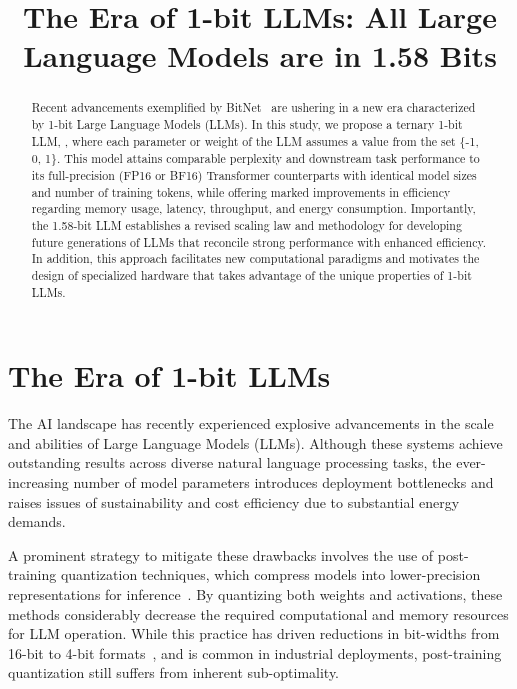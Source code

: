 \title{The Era of 1-bit LLMs: All Large Language Models are in 1.58 Bits}

\begin{abstract}
Recent advancements exemplified by BitNet~\cite{bitnet} are ushering in a new era characterized by 1-bit Large Language Models (LLMs). In this study, we propose a ternary 1-bit LLM, \textbf{}, where each parameter or weight of the LLM assumes a value from the set \{-1, 0, 1\}. This model attains comparable perplexity and downstream task performance to its full-precision (FP16 or BF16) Transformer counterparts with identical model sizes and number of training tokens, while offering marked improvements in efficiency regarding memory usage, latency, throughput, and energy consumption. Importantly, the 1.58-bit LLM establishes a revised scaling law and methodology for developing future generations of LLMs that reconcile strong performance with enhanced efficiency. In addition, this approach facilitates new computational paradigms and motivates the design of specialized hardware that takes advantage of the unique properties of 1-bit LLMs.
\end{abstract}

\section{The Era of 1-bit LLMs}

The AI landscape has recently experienced explosive advancements in the scale and abilities of Large Language Models (LLMs). Although these systems achieve outstanding results across diverse natural language processing tasks, the ever-increasing number of model parameters introduces deployment bottlenecks and raises issues of sustainability and cost efficiency due to substantial energy demands.

A prominent strategy to mitigate these drawbacks involves the use of post-training quantization techniques, which compress models into lower-precision representations for inference~\cite{smoothquant, gptq, quip, quip_sharp}. By quantizing both weights and activations, these methods considerably decrease the required computational and memory resources for LLM operation. While this practice has driven reductions in bit-widths from 16-bit to 4-bit formats~\cite{gptq, awq}, and is common in industrial deployments, post-training quantization still suffers from inherent sub-optimality.

